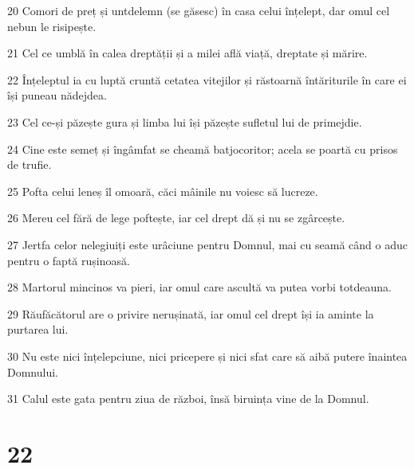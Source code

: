 \par 20 Comori de preț și untdelemn (se găsesc) în casa celui înțelept, dar omul cel nebun le risipește.
\par 21 Cel ce umblă în calea dreptății și a milei află viață, dreptate și mărire.
\par 22 Înțeleptul ia cu luptă cruntă cetatea vitejilor și răstoarnă întăriturile în care ei își puneau nădejdea.
\par 23 Cel ce-și păzește gura și limba lui își păzește sufletul lui de primejdie.
\par 24 Cine este semeț și îngâmfat se cheamă batjocoritor; acela se poartă cu prisos de trufie.
\par 25 Pofta celui leneș îl omoară, căci mâinile nu voiesc să lucreze.
\par 26 Mereu cel fără de lege poftește, iar cel drept dă și nu se zgârcește.
\par 27 Jertfa celor nelegiuiți este urâciune pentru Domnul, mai cu seamă când o aduc pentru o faptă rușinoasă.
\par 28 Martorul mincinos va pieri, iar omul care ascultă va putea vorbi totdeauna.
\par 29 Răufăcătorul are o privire nerușinată, iar omul cel drept își ia aminte la purtarea lui.
\par 30 Nu este nici înțelepciune, nici pricepere și nici sfat care să aibă putere înaintea Domnului.
\par 31 Calul este gata pentru ziua de război, însă biruința vine de la Domnul.

\chapter{22}

